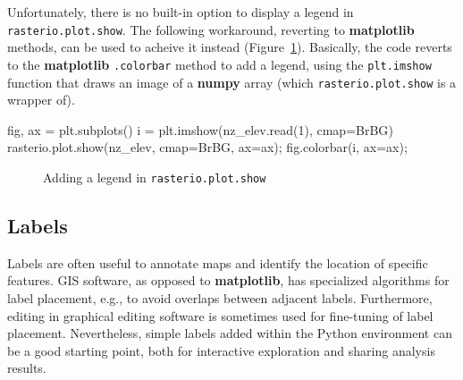 \documentclass[
  letterpaper,
]{krantz}
\newenvironment{Shaded}{\begin{snugshade}}{\end{snugshade}}
\newcommand{\DecValTok}[1]{\textcolor[rgb]{0.68,0.00,0.00}{#1}}
\newcommand{\NormalTok}[1]{\textcolor[rgb]{0.00,0.23,0.31}{#1}}
\newcommand{\OperatorTok}[1]{\textcolor[rgb]{0.37,0.37,0.37}{#1}}
\newcommand{\StringTok}[1]{\textcolor[rgb]{0.13,0.47,0.30}{#1}}
\begin{document}
Unfortunately, there is no built-in option to display a legend in
\texttt{rasterio.plot.show}. The following workaround, reverting to
\textbf{matplotlib} methods, can be used to acheive it instead
(Figure~\ref{fig-plot-symbology-colors-r-scale}). Basically, the code
reverts to the \textbf{matplotlib} \texttt{.colorbar} method to add a
legend, using the \texttt{plt.imshow} function that draws an image of a
\textbf{numpy} array (which \texttt{rasterio.plot.show} is a wrapper
of).

\begin{Shaded}
\begin{Highlighting}[]
\NormalTok{fig, ax }\OperatorTok{=}\NormalTok{ plt.subplots()}
\NormalTok{i }\OperatorTok{=}\NormalTok{ plt.imshow(nz\_elev.read(}\DecValTok{1}\NormalTok{), cmap}\OperatorTok{=}\StringTok{\textquotesingle{}BrBG\textquotesingle{}}\NormalTok{)}
\NormalTok{rasterio.plot.show(nz\_elev, cmap}\OperatorTok{=}\StringTok{\textquotesingle{}BrBG\textquotesingle{}}\NormalTok{, ax}\OperatorTok{=}\NormalTok{ax)}\OperatorTok{;}
\NormalTok{fig.colorbar(i, ax}\OperatorTok{=}\NormalTok{ax)}\OperatorTok{;}
\end{Highlighting}
\end{Shaded}

\begin{figure}[H]


\caption{\label{fig-plot-symbology-colors-r-scale}Adding a legend in
\texttt{rasterio.plot.show}}

\end{figure}%

\subsection{Labels}\label{sec-plot-static-labels}

Labels are often useful to annotate maps and identify the location of
specific features. GIS software, as opposed to \textbf{matplotlib}, has
specialized algorithms for label placement, e.g., to avoid overlaps
between adjacent labels. Furthermore, editing in graphical editing
software is sometimes used for fine-tuning of label placement.
Nevertheless, simple labels added within the Python environment can be a
good starting point, both for interactive exploration and sharing
analysis results.
\end{document}
